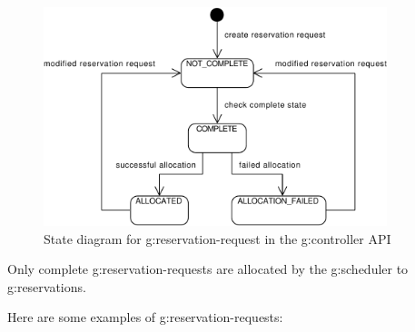 \begin{figure}[ht!]
\centering\includegraphics[width=10cm]{diagrams/smd_api_reservation_request}
\caption{State diagram for \gls{g:reservation-request} in the \gls{g:controller} API}
\label{fig:smd_api_reservation_request}
\end{figure}

Only complete \glspl{g:reservation-request} are allocated by the \gls{g:scheduler} to \glspl{g:reservation}.

Here are some examples of \glspl{g:reservation-request}:


